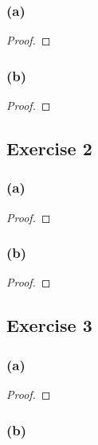 \documentclass[14pt]{extarticle}
\begin{document}
\subsubsection{(a)}

\begin{proof}

\end{proof}

\subsubsection{(b)}

\begin{proof}

\end{proof}

\subsection{Exercise 2}

\subsubsection{(a)}

\begin{proof}

\end{proof}

\subsubsection{(b)}

\begin{proof}

\end{proof}

\subsection{Exercise 3}

\subsubsection{(a)}

\begin{proof}

\end{proof}

\subsubsection{(b)}
\end{document}
